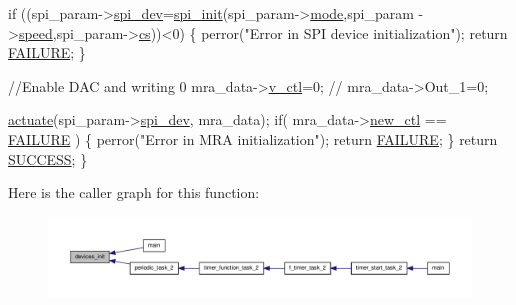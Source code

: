 \begin{DoxyCode}
  \textcolor{keywordflow}{if} ((spi\_param->\hyperlink{structSPI__PARAM__STRUCT_abe385c44333d268d17cf648c8e371cad}{spi\_dev}=\hyperlink{communication_2spi__functions_8c_a70764aca888e93b0329e7a62c9312704}{spi\_init}(spi\_param->\hyperlink{structSPI__PARAM__STRUCT_a82c546c99f6c3daed73c1e23426be847}{mode},spi\_param
      ->\hyperlink{structSPI__PARAM__STRUCT_a53a8d386594a81eb9bc6f971bfe36c54}{speed},spi\_param->\hyperlink{structSPI__PARAM__STRUCT_ae0d62e0a5554783d710b677a017e246f}{cs}))<0) 
  \{
    perror(\textcolor{stringliteral}{"Error in SPI device initialization"});
    \textcolor{keywordflow}{return} \hyperlink{calibration_2calibration_8h_a6d58f9ac447476b4e084d7ca383f5183}{FAILURE};
  \}

  \textcolor{comment}{//Enable DAC and writing 0}
  mra\_data->\hyperlink{structMRA__DATA__STRUCT_a64b4e6bb604e58de593a60c87942b966}{v\_ctl}=0;
\textcolor{comment}{//  mra\_data->Out\_1=0;}

  \hyperlink{communication_01_07C_xC3_xB3pia_01em_01conflito_01de_01Caio_01Gustavo_01Mesquita_01Angelo_012013-05-17_08_8c_a1d5f01d0124cff7030b5c4951b4bbefa}{actuate}(spi\_param->\hyperlink{structSPI__PARAM__STRUCT_abe385c44333d268d17cf648c8e371cad}{spi\_dev}, mra\_data);
  \textcolor{keywordflow}{if}( mra\_data->\hyperlink{structMRA__DATA__STRUCT_a5b1af89ee717f5b14c18e8ac12e93e75}{new\_ctl} == \hyperlink{calibration_2calibration_8h_a6d58f9ac447476b4e084d7ca383f5183}{FAILURE} )
  \{
        perror(\textcolor{stringliteral}{"Error in MRA initialization"});
        \textcolor{keywordflow}{return} \hyperlink{calibration_2calibration_8h_a6d58f9ac447476b4e084d7ca383f5183}{FAILURE};
  \}
  \textcolor{keywordflow}{return} \hyperlink{calibration_2calibration_8h_aa90cac659d18e8ef6294c7ae337f6b58}{SUCCESS};
\}
\end{DoxyCode}


Here is the caller graph for this function\-:\nopagebreak
\begin{figure}[H]
\begin{center}
\leavevmode
\includegraphics[width=350pt]{communication_01_07C_xC3_xB3pia_01em_01conflito_01de_01Caio_01Gustavo_01Mesquita_01Angelo_012013-05-17_08_8c_a2d1e523ff70db11ca4096f97af5da000_icgraph}
\end{center}
\end{figure}


